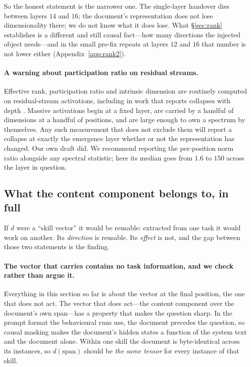\documentclass{article}
\newcommand{\dvec}{\ensuremath{d}}
\begin{document}
So the honest statement is the narrower one. The single-layer handover dies
between layers $14$ and $16$; the document's representation does not lose
dimensionality there; we do not know what it does lose. What \S\ref{sec:rank}
establishes is a different and still causal fact---how many directions the
injected object needs---and in the small pre-fix repeats at layers $12$ and
$16$ that number is not lower either (Appendix~\ref{app:rank2}).



\paragraph{A warning about participation ratio on residual streams.} Effective
rank, participation ratio and intrinsic dimension are routinely computed on
residual-stream activations, including in work that reports collapses with depth
\citep{fernando2026residualspectral, sarkar2026causaldim}. Massive activations
begin at a fixed layer, are carried by a handful of dimensions at a handful of
positions, and are large enough to own a spectrum by themselves. Any such
measurement that does not exclude them will report a collapse at exactly the
emergence layer whether or not the representation has changed. Our own draft did.
We recommend reporting the per-position norm ratio alongside any spectral
statistic; here its median goes from $1.6$ to $150$ across the layer in question.

\subsection{What the content component belongs to, in full}
\label{app:whose}
\label{app:belongs}

If $\dvec$ were a ``skill vector'' it would be reusable: extracted from one task
it would work on another. Its \emph{direction} is reusable. Its \emph{effect}
is not, and the gap between those two statements is the finding.

\paragraph{The vector that carries contains no task information, and we check
rather than argue it.} Everything in this section so far is about the vector at
the final position, the one that does not act. The vector that does act---the
content component over the document's own span---has a property that makes the
question sharp. In the prompt format the behavioural runs use, the document
precedes the question, so causal masking makes the document's hidden states a
function of the system text and the document alone. Within one skill the
document is byte-identical across its instances, so $\dvec(\text{span})$ should
be \emph{the same tensor} for every instance of that skill.
\end{document}
